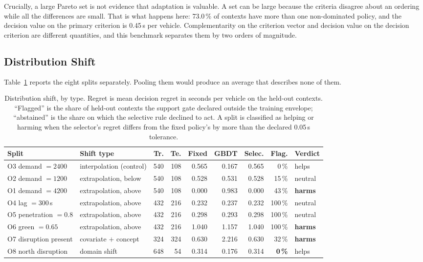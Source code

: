 Crucially, a large Pareto set is not evidence that adaptation is valuable. A set
can be large because the criteria disagree about an ordering while all the
differences are small. That is what happens here: 73.0\,\% of contexts have more
than one non-dominated policy, and the decision value on the primary criterion is
0.45\,s per vehicle. Complementarity on the criterion vector and decision value on
the decision criterion are different quantities, and this benchmark separates them
by two orders of magnitude.

\subsection{Distribution Shift}
\label{sec:shift}

Table~\ref{tab:shift} reports the eight splits separately. Pooling them would
produce an average that describes none of them.

\begin{table}[htbp]
\centering\scriptsize
\setlength{\tabcolsep}{3.2pt}
\caption{Distribution shift, by type. Regret is mean decision regret in seconds
per vehicle on the held-out contexts. ``Flagged'' is the share of held-out
contexts the support gate declared outside the training envelope; ``abstained''
is the share on which the selective rule declined to act. A split is classified
as helping or harming when the selector's regret differs from the fixed policy's
by more than the declared 0.05\,s tolerance.}
\label{tab:shift}
\begin{tabular}{@{}llrrrrrrl@{}}
\toprule
Split & Shift type & Tr. & Te. & Fixed & GBDT & Selec. & Flag. & Verdict\\
\midrule
O3 demand $=2400$ & interpolation (control) & 540 & 108 & 0.565 & 0.167 & 0.565 & 0\,\% & helps\\
O2 demand $=1200$ & extrapolation, below & 540 & 108 & 0.528 & 0.531 & 0.528 & 15\,\% & neutral\\
O1 demand $=4200$ & extrapolation, above & 540 & 108 & 0.000 & 0.983 & 0.000 & 43\,\% & \textbf{harms}\\
O4 lag $=300$\,s & extrapolation, above & 432 & 216 & 0.232 & 0.237 & 0.232 & 100\,\% & neutral\\
O5 penetration $=0.8$ & extrapolation, above & 432 & 216 & 0.298 & 0.293 & 0.298 & 100\,\% & neutral\\
O6 green $=0.65$ & extrapolation, above & 432 & 216 & 1.040 & 1.157 & 1.040 & 100\,\% & \textbf{harms}\\
O7 disruption present & covariate $+$ concept & 324 & 324 & 0.630 & 2.216 & 0.630 & 32\,\% & \textbf{harms}\\
O8 north disruption & domain shift & 648 & 54 & 0.314 & 0.176 & 0.314 & \textbf{0\,\%} & helps\\
\bottomrule
\end{tabular}
\end{table}

